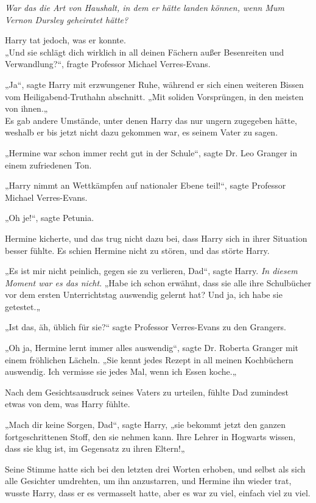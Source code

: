 {\emph{War das die Art von Haushalt, in dem er hätte landen können, wenn Mum Vernon Dursley geheiratet hätte?}

Harry tat jedoch, was er konnte.\\ „Und sie schlägt dich wirklich in all deinen Fächern außer Besenreiten und Verwandlung?“, fragte Professor Michael Verres-Evans.

„Ja“, sagte Harry mit erzwungener Ruhe, während er sich einen weiteren Bissen vom Heiligabend-Truthahn abschnitt. „Mit soliden Vorsprüngen, in den meisten von ihnen.„\\ Es gab andere Umstände, unter denen Harry das nur ungern zugegeben hätte, weshalb er bis jetzt nicht dazu gekommen war, es seinem Vater zu sagen.

„Hermine war schon immer recht gut in der Schule“, sagte Dr. Leo Granger in einem zufriedenen Ton.

„Harry nimmt an Wettkämpfen auf nationaler Ebene teil!“, sagte Professor Michael Verres-Evans.

„Oh je!“, sagte Petunia.

Hermine kicherte, und das trug nicht dazu bei, dass Harry sich in ihrer Situation besser fühlte. Es schien Hermine nicht zu stören, und das störte Harry.

„Es ist mir nicht peinlich, gegen sie zu verlieren, Dad“, sagte Harry. \emph{In diesem Moment war es das nicht}. „Habe ich schon erwähnt, dass sie alle ihre Schulbücher vor dem ersten Unterrichtstag auswendig gelernt hat? Und ja, ich habe sie getestet.„

„Ist das, äh, üblich für sie?“ sagte Professor Verres-Evans zu den Grangers.

„Oh ja, Hermine lernt immer alles auswendig“, sagte Dr. Roberta Granger mit einem fröhlichen Lächeln. „Sie kennt jedes Rezept in all meinen Kochbüchern auswendig. Ich vermisse sie jedes Mal, wenn ich Essen koche.„

Nach dem Gesichtsausdruck seines Vaters zu urteilen, fühlte Dad zumindest etwas von dem, was Harry fühlte.

„Mach dir keine Sorgen, Dad“, sagte Harry, „sie bekommt jetzt den ganzen fortgeschrittenen Stoff, den sie nehmen kann. Ihre Lehrer in Hogwarts wissen, dass sie klug ist, im Gegensatz zu ihren Eltern!„

Seine Stimme hatte sich bei den letzten drei Worten erhoben, und selbst als sich alle Gesichter umdrehten, um ihn anzustarren, und Hermine ihn wieder trat, wusste Harry, dass er es vermasselt hatte, aber es war zu viel, einfach viel zu viel.

}
